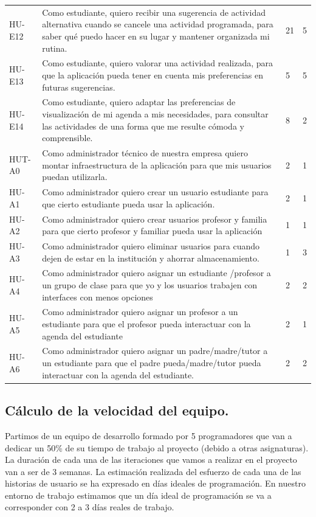 \begin{xltabular}{\textwidth}{p{1.8cm} X p{1.3cm} p{1.1cm}}
HU-E12 & Como estudiante, quiero recibir una sugerencia de actividad alternativa cuando se cancele una actividad programada, para saber qué puedo hacer en su lugar y mantener organizada mi rutina.~ & 21 & 5 \\
HU-E13 & Como estudiante, quiero valorar una actividad realizada, para que la aplicación pueda tener en cuenta mis preferencias en futuras sugerencias.~ & 5 & 5 \\
HU-E14 & Como estudiante, quiero adaptar las preferencias de visualización de mi agenda a mis necesidades, para consultar las actividades de una forma que me resulte cómoda y comprensible.~ & 8 & 2 \\
HUT-A0 & Como administrador técnico de nuestra empresa quiero montar infraestructura de la aplicación para que mis usuarios puedan utilizarla.~ & 2 & 1 \\
HU-A1 & Como administrador quiero crear un usuario estudiante para que cierto estudiante pueda usar la aplicación.~ & 2 & 1 \\
HU-A2 & Como administrador quiero crear usuarios profesor y familia para que cierto profesor y familiar pueda usar la aplicación & 1 & 1 \\
HU-A3 & Como administrador quiero eliminar usuarios para cuando dejen de estar en la institución y ahorrar almacenamiento.~ & 1 & 3 \\
HU-A4 & Como administrador quiero asignar un estudiante /profesor a un grupo de clase para que yo y los usuarios trabajen con interfaces con menos opciones & 2 & 2 \\
HU-A5 & Como administrador quiero asignar un profesor a un estudiante para que el profesor pueda interactuar con la agenda del estudiante & 2 & 1 \\
HU-A6 & Como administrador quiero asignar un padre/madre/tutor a un estudiante para que el padre pueda/madre/tutor pueda interactuar con la agenda del estudiante.~ & 2 & 2 \\
\end{xltabular}



\subsection{Cálculo de la velocidad del equipo.}
Partimos de un equipo de desarrollo formado por 5 programadores que van a dedicar un 50\% de su tiempo de trabajo al proyecto (debido a otras asignaturas). La duración de cada una de las iteraciones que vamos a realizar en el proyecto van a ser de 3 semanas. La estimación realizada del esfuerzo de cada una de las historias de usuario se ha expresado en días ideales de programación. En nuestro entorno de trabajo estimamos que un día ideal de programación se va a corresponder con 2 a 3 días reales de trabajo.

